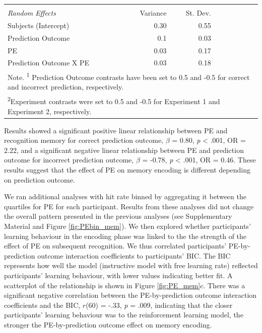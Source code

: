 \documentclass[a4paper,12pt]{article}
\begin{document}
\begin{landscape}
\begin{table}
{\begin{tabular} {l r r r r r r}
& & & & & &  \\
  \textit{ Random Effects} & Variance  & St. Dev.\\\cmidrule{1-3}
Subjects (Intercept) & 0.30 & 0.55 \\
Prediction Outcome & 0.1 & 0.03 \\
PE & 0.03 & 0.17 \\
Prediction Outcome X PE & 0.03 & 0.18 \\
\bottomrule
\multicolumn{7}{l}{\footnotesize Note. \textsuperscript{1} Prediction Outcome contrasts have been set to 0.5 and -0.5 for correct and incorrect prediction, respectively.}\\
\multicolumn{7}{l}{\footnotesize \textsuperscript{2}Experiment contrasts were set to 0.5 and -0.5 for Experiment 1 and Experiment 2, respectively.}

    \end{tabular}
}
\label{tab:Main}

    \end{table}

\end{landscape}

\pagestyle{plain}



 Results showed a significant positive linear relationship between PE and recognition memory for correct prediction outcome, $\beta$ = 0.80, \textit{p} < .001, OR = 2.22, and a significant negative linear relationship between PE and prediction outcome for incorrect prediction outcome, $\beta$ = -0.78, \textit{p} < .001, OR = 0.46.
These results suggest that the effect of PE on memory encoding is different depending on prediction outcome. \par

We ran additional analyses with hit rate binned by aggregating it between the quartiles for PE for each participant. Results from these analyses did not change the overall pattern presented in the previous analyses (see Supplementary Material and Figure \ref{fig:PEbin_mem}). We then explored whether participants' learning behaviour in the encoding phase was linked to the the strength of the effect of PE on subsequent recognition. We thus correlated participants' PE-by-prediction outcome interaction coefficients to participants' BIC. The BIC represents how well the model (instructive model with free learning rate) reflected participants' learning behaviour, with lower values indicating better fit. A scatterplot of the relationship is shown in Figure \ref{fig:PE_mem}c.
There was a significant negative correlation between the PE-by-prediction outcome interaction coefficients and the BIC,  $r$(60) = -.33, \textit{p} = .009, indicating that the closer participants' learning behaviour was to the reinforcement learning model, the stronger the PE-by-prediction outcome effect on memory encoding.
 
\end{document}
